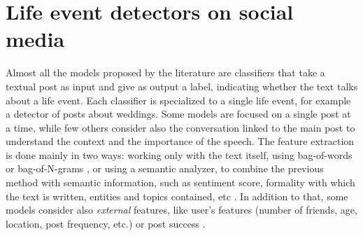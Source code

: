 \section{Life event detectors on social media}
\label{sec:socialmediadetectors}
Almost all the models proposed by the literature are classifiers that take a textual post as input and give as output a label, indicating whether the text talks about a life event. Each classifier is specialized to a single life event, for example a detector of posts about weddings. Some models are focused on a single post at a time, while few others \cite{cavalin2015multiple, moyano2015life} consider also the conversation linked to the main post to understand the context and the importance of the speech. The feature extraction is done mainly in two ways: working only with the text itself, using bag-of-words or bag-of-N-grams \cite{cavalinclassification, di2013detecting, li2014major}, or using a semantic analyzer, to combine the previous method with semantic information, such as sentiment score, formality with which the text is written, entities and topics contained, etc \cite{khobarekar2013detecting}. In addition to that, some models consider also \emph{external} features, like user's features (number of friends, age, location, post frequency, etc.) or post success \cite{dickinson2015identifying}.

